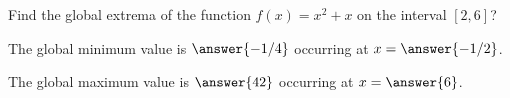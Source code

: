 \documentclass{ximera}
\begin{document}
\begin{exercise}

Find the global extrema of the function $f(x) = x^2 +x$ on the interval
$[2,6]$?

The global minimum value is $\answer{-1/4}$ occurring at $x = \answer{-1/2}$.

The global maximum value is $\answer{42}$ occurring at $x = \answer{6}$.

\end{exercise}
\end{document}
